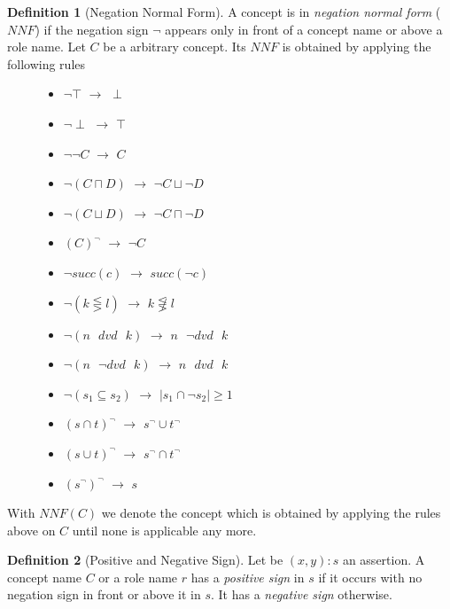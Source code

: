 \documentclass[a4paper,11pt]{scrartcl}
\theoremstyle{break}
\theoremstyle{definition}
\newtheorem{mydef}{Definition}
\begin{document}
\begin{mydef}[Negation Normal Form]
A concept is in \textit{negation normal form} ($NNF$) if the negation sign $\neg$ appears only in front of a concept name or above a role name. Let $C$ be a arbitrary concept. Its $NNF$ is obtained by applying the following rules
\begin{figure}[H]
\begin{minipage}[t]{.5\textwidth}
\raggedright
\begin{itemize}
\item $\neg\top$ $\rightarrow$ $\perp$
\item $\neg\perp$ $\rightarrow$ $\top$
\item $\neg\neg C$ $\rightarrow$ $C$
\item $\neg(C\sqcap D)$ $\rightarrow$ $\neg C \sqcup \neg D$
\item $\neg(C\sqcup D)$ $\rightarrow$ $\neg C \sqcap \neg D$
\item $(C)^\neg$ $\rightarrow$ $\neg C$
\item $\neg succ(c)$ $\rightarrow$ $succ(\neg c)$
\end{itemize}
\end{minipage}%
\begin{minipage}[t]{.5\textwidth}
\raggedleft
\begin{itemize}
\item $\neg (k\lesseqgtr l)$ $\rightarrow$ $k\not\lesseqgtr l$
\item $\neg (n\text{ } dvd \text{ } k)$ $\rightarrow$ $n\text{ } \neg dvd \text{ } k$
\item $\neg (n\text{ } \neg dvd \text{ } k)$ $\rightarrow$ $n\text{ } dvd \text{ } k$
\item $\neg (s_1\subseteq s_2)$ $\rightarrow$ $|s_1\cap\neg s_2|\geq 1$
\item $(s\cap t)^\neg$ $\rightarrow$ $s^\neg \cup t^\neg$
\item $(s\cup t)^\neg$ $\rightarrow$ $s^\neg \cap t^\neg$
\item $(s^\neg)^\neg$ $\rightarrow$ $s$
\end{itemize}
\end{minipage}
\end{figure}
\end{mydef}
With $NNF(C)$ we denote the concept which is obtained by applying the rules above on $C$ until none is applicable any more.
\begin{mydef}[Positive and Negative Sign]
Let be $(x,y):s$ an assertion. A concept name $C$ or a role name $r$ has a \textit{positive sign} in $s$ if it occurs with no negation sign in front or above it in $s$. It has a \textit{negative sign} otherwise.
\end{mydef}
\end{document}
